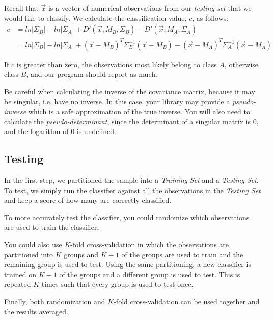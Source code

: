 \documentclass{article}
\begin{document}
Recall that $\vec{x}$ is a vector of numerical observations from our
\emph{testing set} that we would like to classify. We calculate the
classification value, $c$, as follows:
\[\begin{split}
  c 
  &= ln|\Sigma_B| - ln|\Sigma_A| + D'(\vec{x},M_B,\Sigma_B) - D'(\vec{x},M_A,\Sigma_A) \\
  &= ln|\Sigma_B| - ln|\Sigma_A| + (\vec{x}-M_B)^T \Sigma_B^{-1} (\vec{x}-M_B) -(\vec{x}-M_A)^T \Sigma_A^{-1} (\vec{x}-M_A)
\end{split} \]

If $c$ is greater than zero, the observations most likely belong
to class $A$, otherwise class $B$, and our program should report as much.

\begin{note}
Be careful when calculating the inverse of the covariance matrix,
because it may be singular, i.e. have no inverse.  In this case, your
library may provide a \emph{pseudo-inverse}\cite{wiki_pinv} which is
a safe approximation of the true inverse. You will also need to calculate the
\emph{pseudo-determinant}\cite{wiki_pdet}, since the determinant of a singular
matrix is $0$, and the logarithm of $0$ is undefined.
\end{note}

\subsection{Testing}
\label{ss_testing}

In the first step, we partitioned the sample into a \emph{Training
  Set} and a \emph{Testing Set}.  To test, we simply run the
  classifier against all the observations in the \emph{Testing Set}
  and keep a score of how many are correctly classified.

To more accurately test the classifier, you could randomize which
observations are used to train the classifier.

You could also use $K$-fold cross-validation in which the observations
are partitioned into $K$ groups and $K-1$ of the groups are used to
train and the remaining group is used to test.  Using the same
partitioning, a new classifier is trained on $K-1$ of the groups and a
different group is used to test.  This is repeated $K$ times such that
every group is used to test once.

Finally, both randomization and $K$-fold cross-validation can be used
together and the results averaged.

\appendix
\end{document}
